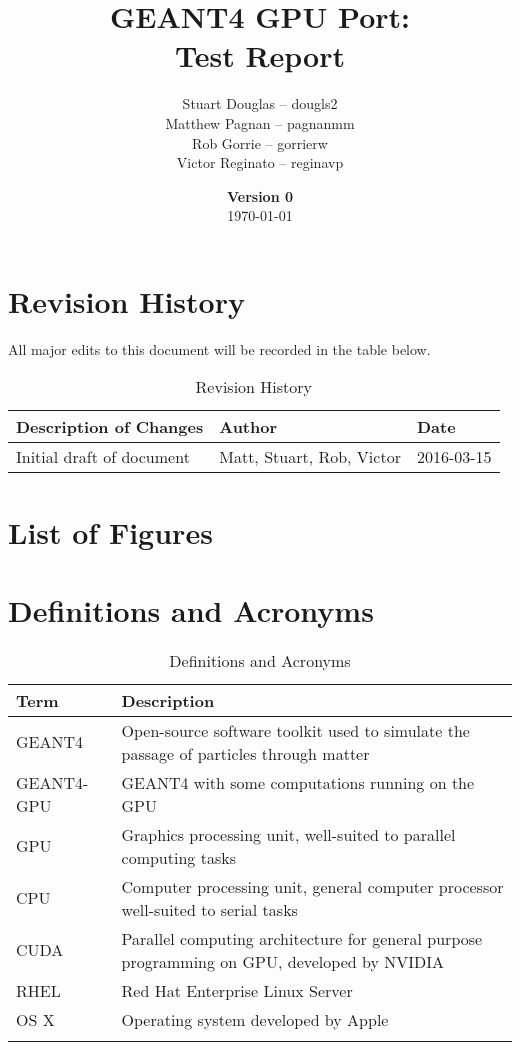 \documentclass[12pt]{article}
\title{
\LARGE GEANT4 GPU Port:
\\\vspace{10mm}
\large \textbf{Test Report}
\vspace{40mm}
}
\author{
Stuart Douglas -- dougls2
\\Matthew Pagnan -- pagnanmm
\\Rob Gorrie -- gorrierw
\\Victor Reginato -- reginavp
\vspace{10mm}
}
\date{\vfill \textbf{Version 0}\\ \today}
\begin{document}

\maketitle
\newpage

\tableofcontents
\newpage
{}
\restoregeometry

\section*{Revision History}
All major edits to this document will be recorded in the table below.

\begin{table}[h]
\centering
\caption{Revision History}\label{Table_Revision}
\begin{tabular}{lll}
\toprule
\bf Description of Changes & \bf Author & \bf Date\\\midrule
Initial draft of document & Matt, Stuart, Rob, Victor  & 2016-03-15\\
\bottomrule
\end{tabular}
\end{table}

\section*{List of Figures}

\section*{Definitions and Acronyms} %
\begin{table}[h]
\centering
\caption{Definitions and Acronyms}
\begin{tabularx}{\textwidth}{l|X}
\Xhline{2\arrayrulewidth}
\bf Term & \bf Description\\
\hline
GEANT4 & Open-source software toolkit used to simulate the passage of particles through matter\\\hline
GEANT4-GPU & GEANT4 with some computations running on the GPU\\\hline
GPU & Graphics processing unit, well-suited to parallel computing tasks\\\hline
CPU & Computer processing unit, general computer processor well-suited to serial tasks\\\hline
CUDA & Parallel computing architecture for general purpose programming on GPU, developed by NVIDIA\\\hline
RHEL & Red Hat Enterprise Linux Server\\\hline
OS X & Operating system developed by Apple\\
\Xhline{2\arrayrulewidth}
\end{tabularx}
\end{table}
\end{document}
